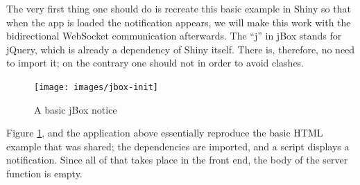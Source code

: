\documentclass[10pt,]{krantz}
\makeatletter
\newenvironment{Shaded}{\begin{snugshade}}{\end{snugshade}}
\newcommand{\ControlFlowTok}[1]{\textcolor[rgb]{0.27,0.27,0.27}{\textbf{#1}}}
\newcommand{\DataTypeTok}[1]{\textcolor[rgb]{0.27,0.27,0.27}{#1}}
\newcommand{\KeywordTok}[1]{\textcolor[rgb]{0.27,0.27,0.27}{\textbf{#1}}}
\newcommand{\NormalTok}[1]{#1}
\newcommand{\OperatorTok}[1]{\textcolor[rgb]{0.43,0.43,0.43}{\textbf{#1}}}
\newcommand{\StringTok}[1]{\textcolor[rgb]{0.5,0.5,0.5}{#1}}
\newenvironment{kframe}{%
\medskip{}
\setlength{\fboxsep}{.8em}
 \def\at@end@of@kframe{}%
 \ifinner\ifhmode%
  \def\at@end@of@kframe{\end{minipage}}%
  \begin{minipage}{\columnwidth}%
 \fi\fi%
 \def\FrameCommand##1{\hskip\@totalleftmargin \hskip-\fboxsep
 \colorbox{shadecolor}{##1}\hskip-\fboxsep
     \hskip-\linewidth \hskip-\@totalleftmargin \hskip\columnwidth}%
 \MakeFramed {\advance\hsize-\width
   \@totalleftmargin\z@ \linewidth\hsize
   \@setminipage}}%
 {\par\unskip\endMakeFramed%
 \at@end@of@kframe}
\renewenvironment{Shaded}{\begin{kframe}}{\end{kframe}}
\makeatother
\begin{document}
The very first thing one should do is recreate this basic example in Shiny so that when the app is loaded the notification appears, we will make this work with the bidirectional WebSocket communication afterwards. The ``j'' in jBox stands for jQuery, which is already a dependency of Shiny itself. There is, therefore, no need to import it; on the contrary one should not in order to avoid clashes.

\begin{Shaded}
\end{Shaded}

\begin{figure}[H]

{\centering \texttt{[image: images/jbox-init]} 

}

\caption{A basic jBox notice}\label{fig:jbox-init}
\end{figure}

Figure \ref{fig:jbox-init}, and the application above essentially reproduce the basic HTML example that was shared; the dependencies are imported, and a script displays a notification. Since all of that takes place in the front end, the body of the server function is empty.
\end{document}
